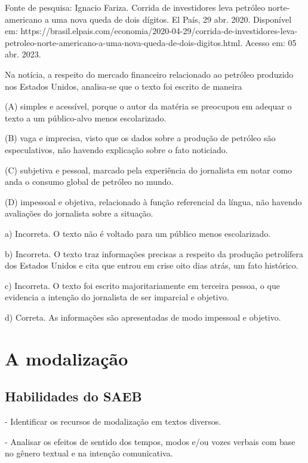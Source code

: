 \begin{itemize}
\begin{itemize}
{\begin{itemize}
\begin{itemize}
Fonte de pesquisa: Ignacio Fariza. Corrida de investidores leva petróleo
norte-americano a uma nova queda de dois dígitos. El País, 29 abr. 2020.
Disponível em:
https://brasil.elpais.com/economia/2020-04-29/corrida-de-investidores-leva-petroleo-norte-americano-a-uma-nova-queda-de-dois-digitos.html.
Acesso em: 05 abr. 2023.

Na notícia, a respeito do mercado financeiro relacionado ao petróleo
produzido nos Estados Unidos, analisa-se que o texto foi escrito de
maneira

(A) simples e acessível, porque o autor da matéria se preocupou em
adequar o texto a um público-alvo menos escolarizado.

(B) vaga e imprecisa, visto que os dados sobre a produção de petróleo
são especulativos, não havendo explicação sobre o fato noticiado.

(C) subjetiva e pessoal, marcado pela experiência do jornalista em notar
como anda o consumo global de petróleo no mundo.

(D) impessoal e objetiva, relacionado à função referencial da língua,
não havendo avaliações do jornalista sobre a situação.


a) Incorreta. O texto não é voltado para um público menos escolarizado.

b) Incorreta. O texto traz informações precisas a respeito da produção
petrolífera dos Estados Unidos e cita que entrou em crise oito dias
atrás, um fato histórico.

c) Incorreta. O texto foi escrito majoritariamente em terceira pessoa, o
que evidencia a intenção do jornalista de ser imparcial e objetivo.

d) Correta. As informações são apresentadas de modo impessoal e
objetivo.

\chapter{A modalização}

\section{Habilidades do SAEB}

- Identificar os recursos de modalização em textos diversos.

- Analisar os efeitos de sentido dos tempos, modos e/ou vozes verbais
com base no gênero textual e na intenção comunicativa.


\end{itemize}
\end{itemize}}
\end{itemize}
\end{itemize}
